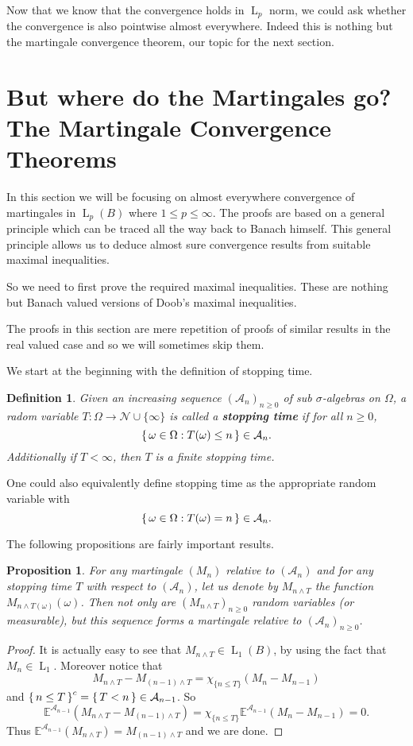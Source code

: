 \documentclass[]{report}
\newcommand{\lp}[2]{\operatorname{L}_{#1}({#2})}
\newcommand*{\extop}[1]{\mathbb{E}^{{#1}}}
\newtheorem{prop}[theorem]{Proposition}
\newtheorem{Def}[theorem]{Definition}
\begin{document}
Now that we know that the convergence holds in $\operatorname{L}_p$ norm, we could ask whether the convergence is also pointwise almost everywhere. Indeed this is nothing but the martingale convergence theorem, our topic for the next section.

\section{But where do the Martingales go? The Martingale Convergence Theorems}

In this section we will be focusing on almost everywhere convergence of martingales in $\lp{p}{B}$ where $1\leq p \leq \infty$. The proofs are based on a general principle which can be traced all the way back to Banach himself. This general principle allows us to deduce almost sure convergence results from suitable maximal inequalities. 

So we need to first prove the required maximal inequalities. These are nothing but Banach valued versions of Doob's maximal inequalities. 

The proofs in this section are mere repetition of proofs of similar results in the real valued case and so we will sometimes skip them.

We start at the beginning with the definition of stopping time.
\begin{Def}
	Given an increasing sequence $(\mathcal{A}_n)_{n\geq0}$ of sub $\sigma$-algebras on $\Omega$, a radom variable $T: \Omega \rightarrow \mathcal{N}\cup \{\infty\}$ is called a \textbf{stopping time} if for all $n\geq0$,
	\[ \set{\omega \in \Omega: T(\omega)\leq n } \in \mathcal{A}_n. \]Additionally if $T<\infty$, then $T$ is a finite stopping time.
\end{Def}
One could also equivalently define stopping time as the appropriate random variable with \[ \set{\omega \in \Omega: T(\omega)= n } \in \mathcal{A}_n. \]

The following propositions are fairly important results.
\begin{prop}
	For any martingale $(M_n)$ relative to $(\mathcal{A}_n)$ and for any stopping time $T$ with respect to $(\mathcal{A}_n)$, let us denote by $M_{n\wedge T}$ the function $M_{n\wedge T(\omega)}(\omega)$. Then not only are $(M_{n\wedge T})_{n\geq 0}$ random variables  (or measurable), but this sequence forms a martingale relative to $(\mathcal{A}_n)_{n\geq 0}$.
\end{prop}
\begin{proof}
	It is actually easy to see that $M_{n\wedge T} \in \lp{1}{B}$, by using the fact that $M_n \in \operatorname{L}_1$. Moreover notice that \[ M_{n\wedge T}-M_{(n-1)\wedge T}= \chi_{\{n\leq T\}}(M_n-M_{n-1}) \]
	and $\set{n\leq T}^c=\set{T<n} \in \mathcal{A}_{n-1}$. So
	\[ \extop{\mathcal{A}_{n-1}}(M_{n\wedge T}-M_{(n-1)\wedge T}) = \chi_{\{n\leq T\}}\extop{\mathcal{A}_{n-1}}(M_n-M_{n-1})=0. \]
	Thus $\extop{\mathcal{A}_{n-1}}(M_{n\wedge T})= M_{(n-1)\wedge T}$ and we are done.
\end{proof}
\end{document}
